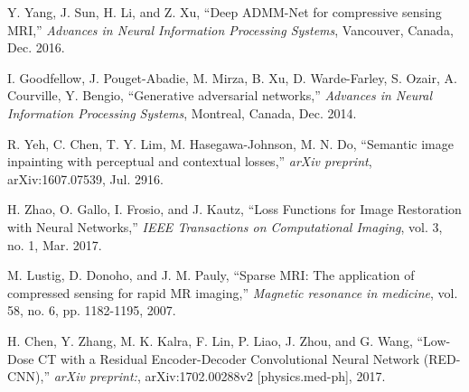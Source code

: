 \documentclass{journal}
\begin{document}
\begin{thebibliography}{10}
		
		 Y. Yang, J. Sun, H. Li, and Z. Xu, 
		\newblock ``Deep ADMM-Net for compressive sensing MRI,''
		\newblock \emph{Advances in Neural Information Processing Systems}, Vancouver, Canada, Dec. 2016.
		
		
		
		
		 I. Goodfellow, J. Pouget-Abadie, M. Mirza, B. Xu, D. Warde-Farley, S. Ozair, A. Courville, Y. Bengio,
		\newblock ``Generative adversarial networks,''
		\newblock \emph{Advances in Neural Information Processing Systems}, Montreal, Canada, Dec. 2014.
		
		
		 R. Yeh, C. Chen, T. Y. Lim, M. Hasegawa-Johnson, M. N. Do,
		\newblock ``Semantic image inpainting with perceptual and contextual losses,''
		\newblock \emph{arXiv preprint}, arXiv:1607.07539, Jul. 2916. 
		
		 H. Zhao, O. Gallo, I. Frosio, and J. Kautz,
		\newblock ``Loss Functions for Image Restoration with Neural
		Networks,''
		\newblock \emph{IEEE Transactions on Computational Imaging}, vol. 3, no. 1, Mar. 2017.
	
	
	 M. Lustig, D. Donoho, and J. M. Pauly,
	\newblock ``Sparse MRI: The application of compressed sensing for rapid MR imaging,''
	\newblock \emph{Magnetic resonance in medicine}, vol. 58, no. 6, pp. 1182-1195, 2007.
	
	 H. Chen, Y. Zhang, M. K. Kalra, F. Lin, P. Liao, J. Zhou, and G. Wang,
	\newblock ``Low-Dose CT with a Residual Encoder-Decoder Convolutional Neural Network (RED-CNN),''
	\newblock \emph{arXiv preprint:}, arXiv:1702.00288v2 [physics.med-ph], 2017.
	
	
	
	
	
	
	

\end{thebibliography}



\medskip
\end{document}
